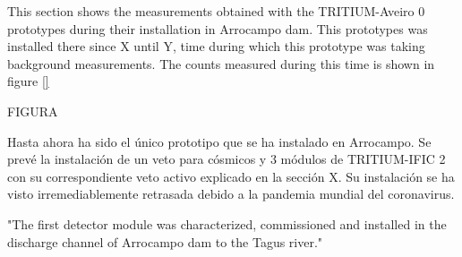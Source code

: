 This section shows the measurements obtained with the TRITIUM-Aveiro 0 prototypes during their installation in Arrocampo dam. This prototypes was installed there since X until Y, time during which this prototype was taking background measurements. The counts measured during this time is shown in figure \ref{}

FIGURA




Hasta ahora ha sido el único prototipo que se ha instalado en Arrocampo. Se prevé la instalación de un veto para cósmicos y 3 módulos de TRITIUM-IFIC 2 con su correspondiente veto activo explicado en la sección X. Su instalación se ha visto irremediablemente retrasada debido a la pandemia mundial del coronavirus.

"The first detector module was characterized, commissioned and installed in the discharge channel of Arrocampo dam to the Tagus river."
